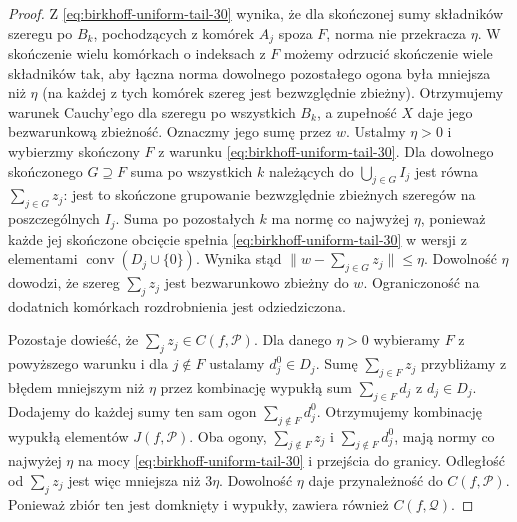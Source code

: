 \begin{proof}
Z \eqref{eq:birkhoff-uniform-tail-30} wynika, że
dla skończonej sumy składników szeregu po $B_k$,
pochodzących z komórek $A_j$ spoza $F$, norma
nie przekracza $\eta$. W skończenie wielu komórkach
o indeksach z $F$ możemy odrzucić skończenie wiele
składników tak, aby łączna norma dowolnego
pozostałego ogona była mniejsza niż $\eta$
(na każdej z tych komórek szereg jest bezwzględnie
zbieżny). Otrzymujemy warunek Cauchy'ego
dla szeregu po wszystkich $B_k$, a zupełność $X$
daje jego bezwarunkową zbieżność. Oznaczmy jego
sumę przez $w$. Ustalmy $\eta>0$ i wybierzmy
skończony $F$ z warunku \eqref{eq:birkhoff-uniform-tail-30}.
Dla dowolnego skończonego $G\supseteq F$
suma po wszystkich $k$ należących do $\bigcup_{j\in G}I_j$
jest równa $\sum_{j\in G}z_j$: jest to skończone
grupowanie bezwzględnie zbieżnych szeregów na
poszczególnych $I_j$. Suma po pozostałych $k$
ma normę co najwyżej $\eta$, ponieważ każde jej
skończone obcięcie spełnia
\eqref{eq:birkhoff-uniform-tail-30} w wersji
z elementami $\operatorname{conv}(D_j\cup\{0\})$.
Wynika stąd $\|w-\sum_{j\in G}z_j\|\le\eta$.
Dowolność $\eta$ dowodzi, że szereg $\sum_jz_j$
jest bezwarunkowo zbieżny do $w$. Ograniczoność
na dodatnich komórkach rozdrobnienia jest odziedziczona.

Pozostaje dowieść, że $\sum_jz_j\in C(f,\mathcal P)$.
Dla danego $\eta>0$ wybieramy $F$ z powyższego
warunku i dla $j\notin F$ ustalamy $d_j^0\in D_j$.
Sumę $\sum_{j\in F}z_j$ przybliżamy z błędem
mniejszym niż $\eta$ przez kombinację wypukłą
sum $\sum_{j\in F}d_j$ z $d_j\in D_j$.
Dodajemy do każdej sumy ten sam ogon
$\sum_{j\notin F}d_j^0$. Otrzymujemy kombinację
wypukłą elementów $J(f,\mathcal P)$. Oba ogony,
$\sum_{j\notin F}z_j$ i $\sum_{j\notin F}d_j^0$,
mają normy co najwyżej $\eta$ na mocy
\eqref{eq:birkhoff-uniform-tail-30} i przejścia
do granicy. Odległość od $\sum_jz_j$ jest więc
mniejsza niż $3\eta$. Dowolność $\eta$ daje
przynależność do $C(f,\mathcal P)$. Ponieważ
zbiór ten jest domknięty i wypukły, zawiera
również $C(f,\mathcal Q)$.
\end{proof}

